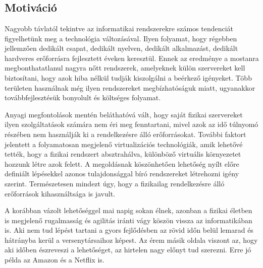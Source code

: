 \chapter{\bevezetes}

\section{Motiváció}

Nagyobb távlatól tekintve az informatikai rendszerekre számos tendenciát figyelhetünk meg a technológia változásával.
Ilyen folyamat, hogy régebben jellemzően dedikált csapat, dedikált nyelven, dedikált alkalmazást, dedikált hardveres erőforrásra fejlesztett éveken keresztül. 
Ennek az eredménye a mostanra megbonthatatlanul nagyra nőtt rendszerek, amelyeknek külön szervereket kell biztosítani, hogy azok hiba nélkül tudják kiszolgálni a beérkező igényeket.
Több területen használnak még ilyen rendszereket megbízhatóságuk miatt, ugyanakkor továbbfejlesztésük bonyolult és költséges folyamat.

Anyagi megfontolások mentén beláthatóvá vált, hogy saját fizikai szervereket ilyen szolgáltatások számára nem éri meg fenntartani, mivel azok az idő túlnyomó részében nem használják ki a rendelkezésre álló erőforrásokat.
További faktort jelentett a folyamatosan megjelenő virtualizációs technológiák, amik lehetővé tették, hogy a fizikai rendszert absztrahálva, különböző virtuális környezetet hozzunk létre azok felett.
A megoldásnak köszönhetően lehetőség nyílt előre definiált lépésekkel azonos tulajdonsággal bíró rendszereket létrehozni igény szerint. 
Természetesen mindezt úgy, hogy a fizikailag rendelkezésre álló erőforrások kihasználtsága is javult.

A korábban vázolt lehetőséggel mai napig sokan élnek, azonban a fizikai életben is megjelenő rugalmasság és agilitás iránti vágy köszön vissza az informatikában is. 
Aki nem tud lépést tartani a gyors fejlődésben az rövid időn belül lemarad és hátrányba kerül a versenytársaihoz képest. 
Az érem másik oldala viszont az, hogy aki időben észreveszi a lehetőséget, az hirtelen nagy előnyt tud szerezni. 
Erre jó példa az Amazon\citep{amazon} és a Netflix\citep{netflix} is.  

